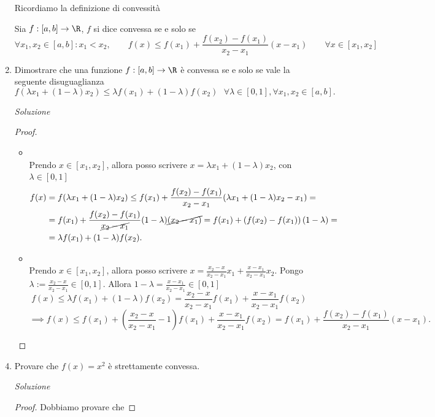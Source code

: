 \documentclass{article}
\begin{document}
\begin{enumerate}[label=\textbf{Esercizio 12.\arabic*.},itemindent=*]
Ricordiamo la definizione di convessità
\begin{shaded}
    \begin{definition}[Convessità]
        Sia $f:[a,b]\to\R$, $f$ si dice convessa se e solo se
        \[\forall x_1,x_2\in [a,b]:x_1 < x_2,\qquad f(x)\leq f(x_1)+\frac{f(x_2)-f(x_1)}{x_2-x_1}(x - x_1)\qquad \forall x\in[x_1,x_2] \]
    \end{definition}
\end{shaded}
\item Dimostrare che una funzione $f:[a,b]\to\R$ è convessa se e solo se vale la seguente disuguaglianza
\[f(\lambda x_1+(1-\lambda)x_2)\leq \lambda f(x_1)+(1-\lambda)f(x_2)~~~\forall \lambda \in [0,1], \forall x_1,x_2\in [a,b].\]
\item[\textit{\large Soluzione~}]~
\begin{proof}~
    \begin{itemize}
        \item \say{$\Rightarrow$}\\
        Prendo $x \in [x_1,x_2]$, allora posso scrivere $x=\lambda x_1+(1-\lambda)x_2$, con $\lambda\in[0,1]$
        \[\begin{aligned}f(x)&=f(\lambda x_1+(1-\lambda)x_2)\leq f(x_1) +\frac{f(x_2)-f(x_1)}{x_2-x_1}(\lambda x_1 +(1-\lambda )x_2-x_1) =\\
        &=f(x_1) +\frac{f(x_2)-f(x_1)}{\cancel{x_2-x_1}}(1-\lambda)\cancel{(x_2-x_1)} = f(x_1) + \left( f(x_2) - f(x_1) \right)(1 -\lambda) =\\&= \lambda f(x_1)+(1-\lambda)f(x_2).\end{aligned}\]
        \item \say{$\Leftarrow$}\\Prendo $x \in [x_1,x_2]$, allora posso scrivere $x=\frac{x_2-x}{x_2-x_1}x_1+\frac{x-x_1}{x_2-x_1}x_2$. Pongo $\lambda:=\frac{x_2-x}{x_2-x_1}\in[0,1]$. Allora $1-\lambda=\frac{x-x_1}{x_2-x_1}\in [0,1]$
        \[f(x)\leq \lambda f(x_1)+(1-\lambda)f(x_2)=\frac{x_2-x}{x_2-x_1}f(x_1)+\frac{x-x_1}{x_2-x_1}f(x_2)\]
        \[\implies f(x)\leq f(x_1) + (\frac{x_2-x}{x_2-x_1}-1)f(x_1)+\frac{x-x_1}{x_2-x_1}f(x_2) = f(x_1) +\frac{f(x_2) - f(x_1)}{x_2 - x_1}(x - x_1).\]
    \end{itemize}
\end{proof}
\item Provare che $f(x)=x^2$ è strettamente convessa.
\item[\textit{\large Soluzione~}]~
\begin{proof} Dobbiamo provare che

\end{proof}
\end{enumerate}
\end{document}
